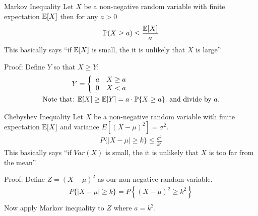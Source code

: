 \begin{frame}{Markov Inequality}
Let $X$ be a \alert{non-negative} random variable with finite expectation $\mathbb{E}[X]$ then for any $a >0$ 
\begin{align*}
\mathbb{P}(X \geq a) \leq \frac{\mathbb{E}[X]}{a}
\end{align*}
This basically says ``if $\mathbb{E}[X]$ is small, the it is unlikely that $X$ is large''.\\ \vspace{0.25cm}
\pause

Proof: Define $Y$ so that $X \geq Y$:
\begin{align*}
Y&=\left\{\begin{array}{ll}a & X \geq a \\ 0 & X<a\end{array}\right.\\
\text{Note that: }& \mathbb{E}[X] \geq \mathbb{E}[Y] = a \cdot \mathbb{P}{}\{X \geq a\}. \text{ and divide by } a.
\end{align*}
\end{frame}

\begin{frame}{Chebyshev Inequality}
Let $X$ be a \alert{non-negative} random variable with finite expectation $\mathbb{E}[X]$ \alert{and variance} $E[(X-\mu)^2]=\sigma^2$.
\begin{align*}
P\{|X-\mu| \geq k\} \leq \frac{\sigma^2}{k^2}
\end{align*}
This basically says ``if $Var(X)$ is small, the it is unlikely that $X$ is too far from the mean''.\\ \vspace{0.25cm}
\pause

Proof: Define $Z=(X-\mu)^2$ as our non-negative random variable.
\begin{align*}
P\{|X-\mu| \geq k\}=P\left\{(X-\mu)^2 \geq k^2\right\}\\ 
\end{align*}
Now apply Markov inequality to $Z$ where $a=k^2$.
\end{frame}





